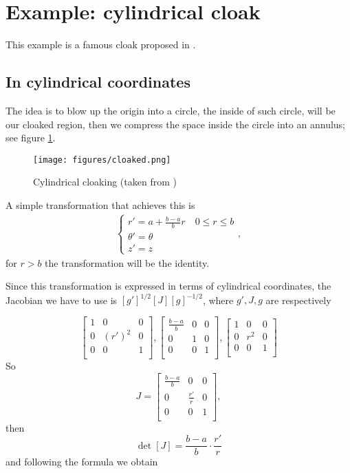 \documentclass{amsart}
\begin{document}
\section{Example: cylindrical cloak}

This example is a famous cloak proposed in \cite{schurig06}.
\subsection{In cylindrical coordinates}
The idea is to blow up the origin into a circle, the inside of such circle, will be our cloaked region,
then we compress the space inside the circle into an annulus; see figure \ref{fig:cloak}.
\begin{figure}
  \begin{center}
    \texttt{[image: figures/cloaked.png]}
  \end{center}
  \caption{Cylindrical cloaking (taken from \cite{schurig06})}\label{fig:cloak}
\end{figure}

A simple transformation that achieves this is
\begin{align}\label{transformation}
\begin{cases}
r'=a+\frac{b-a}{b}r \quad 0\leq r\leq b\\ 
\theta'=\theta\\
z'=z
\end{cases},
\end{align}
for \(r>b\) the transformation will be the identity.

Since this transformation is expressed in terms of cylindrical coordinates,
the Jacobian we have to use is \([g']^{1/2}[J][g]^{-1/2}\),
where \(g',J,g\) are respectively

\[
  \begin{bmatrix}
    1 & 0 & 0\\
    0 & (r')^2 & 0\\
    0 & 0 & 1\\
  \end{bmatrix},
  \begin{bmatrix}
    \frac{b-a}{b} & 0 & 0\\
    0 & 1 & 0\\
    0 & 0 & 1\\
  \end{bmatrix},
  \begin{bmatrix}
    1 & 0 & 0\\
    0 & r^2 & 0\\
    0 & 0 & 1\\
  \end{bmatrix}
\]
So
\[J=
  \begin{bmatrix}
    \frac{b-a}{b}  & 0 & 0\\
    0 & \frac{r'}{r} & 0\\
    0 & 0 & 1\\
  \end{bmatrix},
\]
then
\[
  \det[J]=\frac{b-a}{b}\cdot\frac{r'}{r}
\]
and following the formula we obtain
\end{document}
